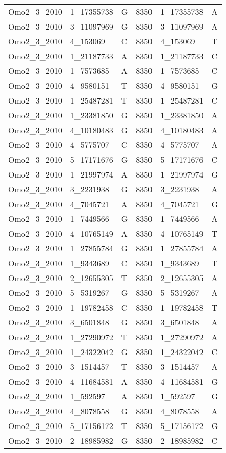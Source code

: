 \begin{center}
\begin{longtable}{|l|l|l|l|l|l|}
Omo2\_3\_2010&1\_17355738&G&8350&1\_17355738&A\\
Omo2\_3\_2010&3\_11097969&G&8350&3\_11097969&A\\
Omo2\_3\_2010&4\_153069&C&8350&4\_153069&T\\
Omo2\_3\_2010&1\_21187733&A&8350&1\_21187733&C\\
Omo2\_3\_2010&1\_7573685&A&8350&1\_7573685&C\\
Omo2\_3\_2010&4\_9580151&T&8350&4\_9580151&G\\
Omo2\_3\_2010&1\_25487281&T&8350&1\_25487281&C\\
Omo2\_3\_2010&1\_23381850&G&8350&1\_23381850&A\\
Omo2\_3\_2010&4\_10180483&G&8350&4\_10180483&A\\
Omo2\_3\_2010&4\_5775707&C&8350&4\_5775707&A\\
Omo2\_3\_2010&5\_17171676&G&8350&5\_17171676&C\\
Omo2\_3\_2010&1\_21997974&A&8350&1\_21997974&G\\
Omo2\_3\_2010&3\_2231938&G&8350&3\_2231938&A\\
Omo2\_3\_2010&4\_7045721&A&8350&4\_7045721&G\\
Omo2\_3\_2010&1\_7449566&G&8350&1\_7449566&A\\
Omo2\_3\_2010&4\_10765149&A&8350&4\_10765149&T\\
Omo2\_3\_2010&1\_27855784&G&8350&1\_27855784&A\\
Omo2\_3\_2010&1\_9343689&C&8350&1\_9343689&T\\
Omo2\_3\_2010&2\_12655305&T&8350&2\_12655305&A\\
Omo2\_3\_2010&5\_5319267&G&8350&5\_5319267&A\\
Omo2\_3\_2010&1\_19782458&C&8350&1\_19782458&T\\
Omo2\_3\_2010&3\_6501848&G&8350&3\_6501848&A\\
Omo2\_3\_2010&1\_27290972&T&8350&1\_27290972&A\\
Omo2\_3\_2010&1\_24322042&G&8350&1\_24322042&C\\
Omo2\_3\_2010&3\_1514457&T&8350&3\_1514457&A\\
Omo2\_3\_2010&4\_11684581&A&8350&4\_11684581&G\\
Omo2\_3\_2010&1\_592597&A&8350&1\_592597&G\\
Omo2\_3\_2010&4\_8078558&G&8350&4\_8078558&A\\
Omo2\_3\_2010&5\_17156172&T&8350&5\_17156172&G\\
Omo2\_3\_2010&2\_18985982&G&8350&2\_18985982&C\\

\end{longtable}
\end{center}

